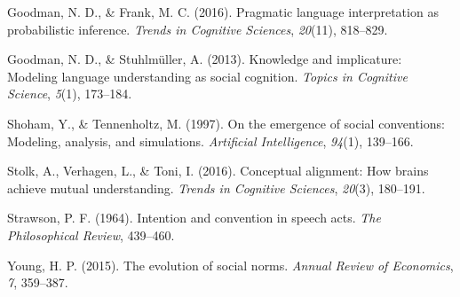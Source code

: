 \documentclass[10pt, letterpaper]{article}
\begin{document}
\hypertarget{ref-GoodmanFrank16_RSATiCS}{}
Goodman, N. D., \& Frank, M. C. (2016). Pragmatic language
interpretation as probabilistic inference. \emph{Trends in Cognitive
Sciences}, \emph{20}(11), 818--829.

\hypertarget{ref-GoodmanStuhlmuller13_KnowledgeImplicature}{}
Goodman, N. D., \& Stuhlmüller, A. (2013). Knowledge and implicature:
Modeling language understanding as social cognition. \emph{Topics in
Cognitive Science}, \emph{5}(1), 173--184.

\hypertarget{ref-ShohamTennenholtz97_EmergenceOfConventions}{}
Shoham, Y., \& Tennenholtz, M. (1997). On the emergence of social
conventions: Modeling, analysis, and simulations. \emph{Artificial
Intelligence}, \emph{94}(1), 139--166.

\hypertarget{ref-StolkVerhagenToni16_ConceptualAlignment}{}
Stolk, A., Verhagen, L., \& Toni, I. (2016). Conceptual alignment: How
brains achieve mutual understanding. \emph{Trends in Cognitive
Sciences}, \emph{20}(3), 180--191.

\hypertarget{ref-Strawson64_IntentionConvention}{}
Strawson, P. F. (1964). Intention and convention in speech acts.
\emph{The Philosophical Review}, 439--460.

\hypertarget{ref-Young15_EvolutionOfSocialNorms}{}
Young, H. P. (2015). The evolution of social norms. \emph{Annual Review
of Economics}, \emph{7}, 359--387.
\end{document}
